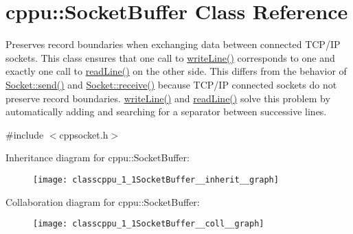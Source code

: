 \hypertarget{classcppu_1_1SocketBuffer}{\section{cppu\+:\+:Socket\+Buffer Class Reference}
\label{classcppu_1_1SocketBuffer}
}


Preserves record boundaries when exchanging data between connected T\+C\+P/\+I\+P sockets. This class ensures that one call to \hyperlink{classcppu_1_1SocketBuffer_a92ae0351aaee8719d34e8c4618495d59}{write\+Line()} corresponds to one and exactly one call to \hyperlink{classcppu_1_1SocketBuffer_a222769d3776b9cbd3a727ee1f0e60358}{read\+Line()} on the other side. This differs from the behavior of \hyperlink{classcppu_1_1Socket_aeac77f859159715e2d63a5a0dc118788}{Socket\+::send()} and \hyperlink{classcppu_1_1Socket_a37c382af52cc02f92c0e19a0c6e0e04f}{Socket\+::receive()} because T\+C\+P/\+I\+P connected sockets do not preserve record boundaries. \hyperlink{classcppu_1_1SocketBuffer_a92ae0351aaee8719d34e8c4618495d59}{write\+Line()} and \hyperlink{classcppu_1_1SocketBuffer_a222769d3776b9cbd3a727ee1f0e60358}{read\+Line()} solve this problem by automatically adding and searching for a separator between successive lines.  




{\ttfamily \#include $<$cppsocket.\+h$>$}



Inheritance diagram for cppu\+:\+:Socket\+Buffer\+:
\nopagebreak
\begin{figure}[H]
\begin{center}
\leavevmode
\texttt{[image: classcppu\_1\_1SocketBuffer\_\_inherit\_\_graph]}
\end{center}
\end{figure}


Collaboration diagram for cppu\+:\+:Socket\+Buffer\+:
\nopagebreak
\begin{figure}[H]
\begin{center}
\leavevmode
\texttt{[image: classcppu\_1\_1SocketBuffer\_\_coll\_\_graph]}
\end{center}
\end{figure}
